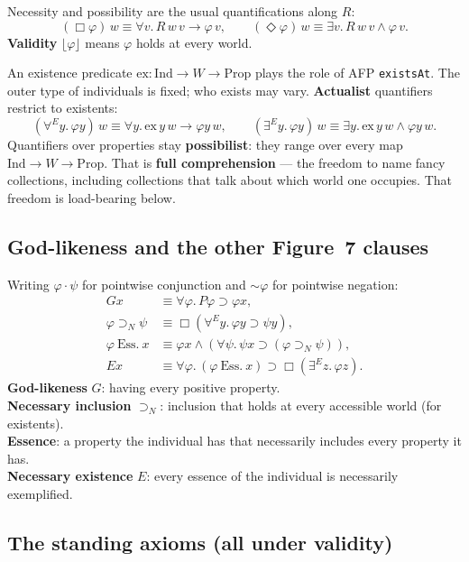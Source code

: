 \documentclass[11pt]{article}
\newcommand{\floor}[1]{\lfloor #1 \rfloor}
\newcommand{\ess}{\mathrel{\mathrm{Ess.}}}
\newcommand{\ex}{\mathrm{ex}}
\newcommand{\Ind}{\mathrm{Ind}}
\begin{document}
Necessity and possibility are the usual quantifications along \(R\):
\[
(\Box\varphi)\,w \equiv \forall v.\, R\,w\,v \to \varphi\,v,
\qquad
(\Diamond\varphi)\,w \equiv \exists v.\, R\,w\,v \land \varphi\,v.
\]
\textbf{Validity} \(\floor{\varphi}\) means \(\varphi\) holds at every world.

An existence predicate \(\ex : \Ind \to W \to \mathrm{Prop}\) plays the role of AFP
\texttt{existsAt}. The outer type of individuals is fixed; who exists may vary.
\textbf{Actualist} quantifiers restrict to existents:
\[
(\forall^E y.\,\varphi y)\,w \equiv \forall y.\, \ex\,y\,w \to \varphi y\,w,
\qquad
(\exists^E y.\,\varphi y)\,w \equiv \exists y.\, \ex\,y\,w \land \varphi y\,w.
\]
Quantifiers over properties stay \textbf{possibilist}: they range over every map
\(\Ind \to W \to \mathrm{Prop}\). That is \textbf{full comprehension} --- the freedom to
name fancy collections, including collections that talk about which world one occupies.
That freedom is load-bearing below.

\subsection{God-likeness and the other Figure~7 clauses}

Writing \(\varphi\cdot\psi\) for pointwise conjunction and \(\sim\varphi\) for pointwise
negation:
\begin{align*}
G x &\equiv \forall\varphi.\, P\varphi \supset \varphi x, \\
\varphi \supset_N \psi &\equiv \Box(\forall^E y.\, \varphi y \supset \psi y), \\
\varphi\ \ess\ x &\equiv \varphi x \land (\forall\psi.\, \psi x \supset (\varphi \supset_N \psi)), \\
E x &\equiv \forall\varphi.\, (\varphi\ \ess\ x) \supset \Box(\exists^E z.\, \varphi z).
\end{align*}
\textbf{God-likeness} \(G\): having every positive property.\\
\textbf{Necessary inclusion} \(\supset_N\): inclusion that holds at every accessible world
(for existents).\\
\textbf{Essence}: a property the individual has that necessarily includes every property it
has.\\
\textbf{Necessary existence} \(E\): every essence of the individual is necessarily
exemplified.

\subsection{The standing axioms (all under validity)}
\end{document}
